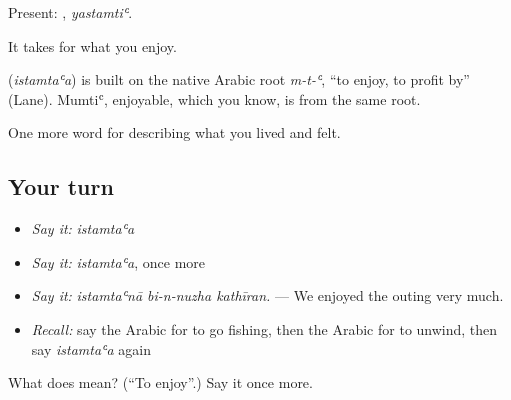 Present: , \emph{yastamtiʿ}.

It takes  for what you enjoy.

\begin{cousinweb}
\textbf{} (\emph{istamtaʿa}) is built on the native Arabic root \emph{m-t-ʿ}, \textquotedblleft{}to enjoy, to profit by\textquotedblright{} (Lane). Mumtiʿ, enjoyable, which you know, is from the same root.
\end{cousinweb}

\begin{grammarlens}[title={What you've built}]
One more word for describing what you lived and felt.
\end{grammarlens}

\subsection*{Your turn}
\begin{itemize}
\raggedright
  \item \emph{Say it:} \emph{istamtaʿa}
  \item \emph{Say it:} \emph{istamtaʿa}, once more
  \item \emph{Say it:} \emph{istamtaʿnā bi-n-nuzha kathīran.} — We enjoyed the outing very much.
  \item \emph{Recall:} say the Arabic for to go fishing, then the Arabic for to unwind, then say \emph{istamtaʿa} again
\end{itemize}

\begin{tcolorbox}[breakable,colback=teal!4,colframe=teal!35!black,title={Before you move on}]
What does  mean? (\textquotedblleft{}To enjoy\textquotedblright{}.) Say it once more.
\end{tcolorbox}
